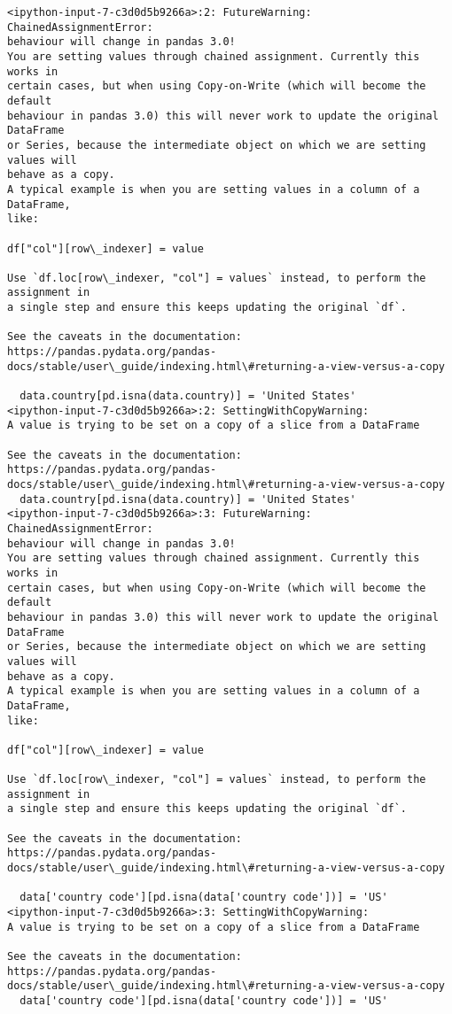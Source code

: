 \documentclass[11pt]{article}
\begin{document}
    \begin{Verbatim}[commandchars=\\\{\}]
<ipython-input-7-c3d0d5b9266a>:2: FutureWarning: ChainedAssignmentError:
behaviour will change in pandas 3.0!
You are setting values through chained assignment. Currently this works in
certain cases, but when using Copy-on-Write (which will become the default
behaviour in pandas 3.0) this will never work to update the original DataFrame
or Series, because the intermediate object on which we are setting values will
behave as a copy.
A typical example is when you are setting values in a column of a DataFrame,
like:

df["col"][row\_indexer] = value

Use `df.loc[row\_indexer, "col"] = values` instead, to perform the assignment in
a single step and ensure this keeps updating the original `df`.

See the caveats in the documentation: https://pandas.pydata.org/pandas-
docs/stable/user\_guide/indexing.html\#returning-a-view-versus-a-copy

  data.country[pd.isna(data.country)] = 'United States'
<ipython-input-7-c3d0d5b9266a>:2: SettingWithCopyWarning:
A value is trying to be set on a copy of a slice from a DataFrame

See the caveats in the documentation: https://pandas.pydata.org/pandas-
docs/stable/user\_guide/indexing.html\#returning-a-view-versus-a-copy
  data.country[pd.isna(data.country)] = 'United States'
<ipython-input-7-c3d0d5b9266a>:3: FutureWarning: ChainedAssignmentError:
behaviour will change in pandas 3.0!
You are setting values through chained assignment. Currently this works in
certain cases, but when using Copy-on-Write (which will become the default
behaviour in pandas 3.0) this will never work to update the original DataFrame
or Series, because the intermediate object on which we are setting values will
behave as a copy.
A typical example is when you are setting values in a column of a DataFrame,
like:

df["col"][row\_indexer] = value

Use `df.loc[row\_indexer, "col"] = values` instead, to perform the assignment in
a single step and ensure this keeps updating the original `df`.

See the caveats in the documentation: https://pandas.pydata.org/pandas-
docs/stable/user\_guide/indexing.html\#returning-a-view-versus-a-copy

  data['country code'][pd.isna(data['country code'])] = 'US'
<ipython-input-7-c3d0d5b9266a>:3: SettingWithCopyWarning:
A value is trying to be set on a copy of a slice from a DataFrame

See the caveats in the documentation: https://pandas.pydata.org/pandas-
docs/stable/user\_guide/indexing.html\#returning-a-view-versus-a-copy
  data['country code'][pd.isna(data['country code'])] = 'US'
    \end{Verbatim}
\end{document}
